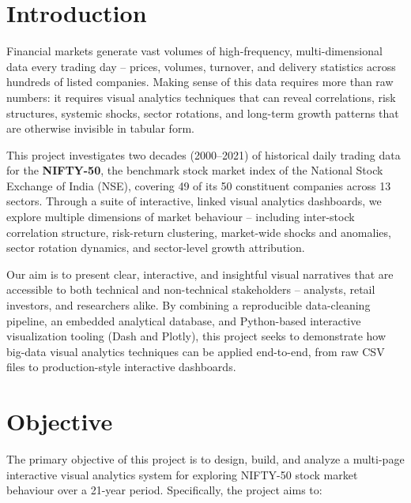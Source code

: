 \documentclass[14pt,a4paper]{extreport}
\begin{document}
\chapter{Introduction}

Financial markets generate vast volumes of high-frequency, multi-dimensional
data every trading day -- prices, volumes, turnover, and delivery statistics
across hundreds of listed companies. Making sense of this data requires more
than raw numbers: it requires visual analytics techniques that can reveal
correlations, risk structures, systemic shocks, sector rotations, and
long-term growth patterns that are otherwise invisible in tabular form.

This project investigates two decades (2000--2021) of historical daily
trading data for the \textbf{NIFTY-50}, the benchmark stock market index of
the National Stock Exchange of India (NSE), covering 49 of its 50
constituent companies across 13 sectors. Through a suite of interactive,
linked visual analytics dashboards, we explore multiple dimensions of market
behaviour -- including inter-stock correlation structure, risk-return
clustering, market-wide shocks and anomalies, sector rotation dynamics, and
sector-level growth attribution.

Our aim is to present clear, interactive, and insightful visual narratives
that are accessible to both technical and non-technical stakeholders --
analysts, retail investors, and researchers alike. By combining a
reproducible data-cleaning pipeline, an embedded analytical database, and
Python-based interactive visualization tooling (Dash and Plotly), this
project seeks to demonstrate how big-data visual analytics techniques can be
applied end-to-end, from raw CSV files to production-style interactive
dashboards.

\chapter{Objective}

The primary objective of this project is to design, build, and analyze a
multi-page interactive visual analytics system for exploring NIFTY-50 stock
market behaviour over a 21-year period. Specifically, the project aims to:
\end{document}
